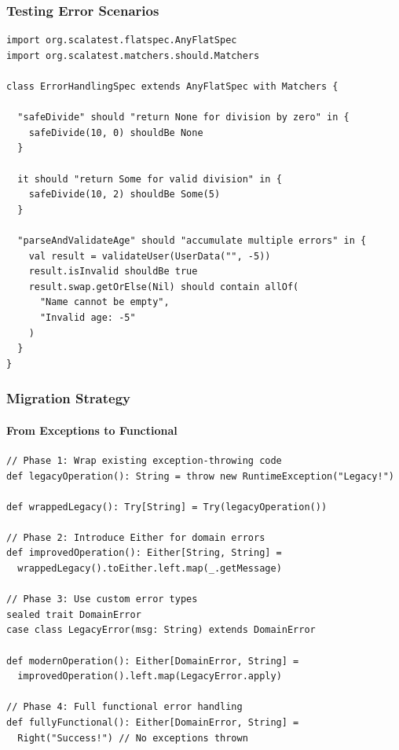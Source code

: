 \documentclass{beamer}
\begin{document}
\begin{frame}[fragile]
\frametitle{Testing Error Scenarios}

\begin{lstlisting}[style=scalaStyle]
import org.scalatest.flatspec.AnyFlatSpec
import org.scalatest.matchers.should.Matchers

class ErrorHandlingSpec extends AnyFlatSpec with Matchers {
  
  "safeDivide" should "return None for division by zero" in {
    safeDivide(10, 0) shouldBe None
  }
  
  it should "return Some for valid division" in {
    safeDivide(10, 2) shouldBe Some(5)
  }
  
  "parseAndValidateAge" should "accumulate multiple errors" in {
    val result = validateUser(UserData("", -5))
    result.isInvalid shouldBe true
    result.swap.getOrElse(Nil) should contain allOf(
      "Name cannot be empty",
      "Invalid age: -5"
    )
  }
}
\end{lstlisting}

\end{frame}

\begin{frame}[fragile]
\frametitle{Migration Strategy}
\framesubtitle{From Exceptions to Functional}

\begin{lstlisting}[style=scalaStyle]
// Phase 1: Wrap existing exception-throwing code
def legacyOperation(): String = throw new RuntimeException("Legacy!")

def wrappedLegacy(): Try[String] = Try(legacyOperation())

// Phase 2: Introduce Either for domain errors
def improvedOperation(): Either[String, String] = 
  wrappedLegacy().toEither.left.map(_.getMessage)

// Phase 3: Use custom error types
sealed trait DomainError
case class LegacyError(msg: String) extends DomainError

def modernOperation(): Either[DomainError, String] = 
  improvedOperation().left.map(LegacyError.apply)

// Phase 4: Full functional error handling
def fullyFunctional(): Either[DomainError, String] = 
  Right("Success!") // No exceptions thrown
\end{lstlisting}

\end{frame}
\end{document}
